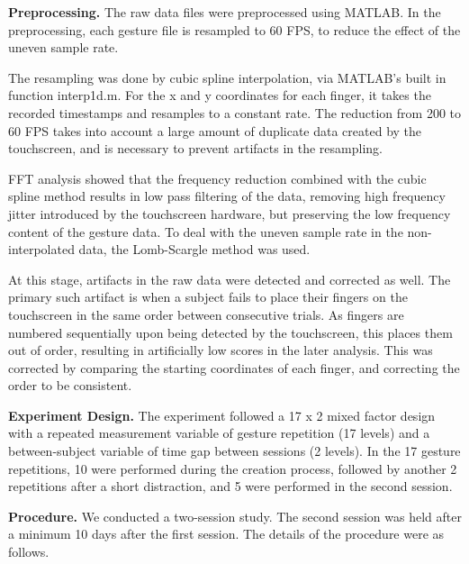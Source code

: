 \documentclass{sig-alternate-10pt}
\begin{document}
\textbf{Preprocessing.} The raw data files were preprocessed using MATLAB. In the preprocessing,  each gesture file is resampled to 60 FPS, to reduce the effect of the uneven sample rate. 



The resampling was done by cubic spline interpolation, via MATLAB's built in function interp1d.m. For the x and y coordinates for each finger, it takes the recorded timestamps and resamples to a constant rate. The reduction from 200 to 60 FPS takes into account a large amount of duplicate data created by the touchscreen, and is necessary to prevent artifacts in the resampling. 

FFT analysis showed that the frequency reduction combined with the cubic spline method results in low pass filtering of the data, removing high frequency jitter introduced by the touchscreen hardware, but preserving the low frequency content of the gesture data. To deal with the uneven sample rate in the non-interpolated data, the Lomb-Scargle method was used. 



At this stage, artifacts in the raw data were detected and corrected as well. The primary such artifact is when a subject fails to place their fingers on the touchscreen in the same order between consecutive trials. As fingers are numbered sequentially upon being detected by the touchscreen, this places them out of order, resulting in artificially low scores in the later analysis. This was corrected by comparing the starting coordinates of each finger, and correcting the order to be consistent. 













\textbf{Experiment Design.} The experiment followed a 17 x 2 mixed factor design with a repeated measurement variable of gesture repetition (17 levels) and a between-subject variable of time gap between sessions (2 levels). In the 17 gesture repetitions, 10 were performed during the creation process, followed  by another 2 repetitions after a short distraction, and 5 were performed in the second session.





\textbf{Procedure.} We conducted a two-session study. The second session was held after a minimum 10 days after the first session. The details of the procedure were as follows.
\end{document}
